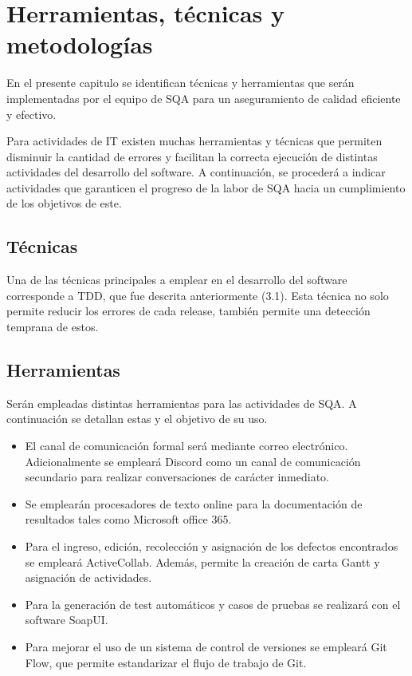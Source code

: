 
\chapter{Herramientas, técnicas y metodologías}

En el presente capitulo se identifican técnicas y herramientas que serán implementadas por el equipo de SQA para un aseguramiento de calidad eficiente y efectivo.

Para actividades de IT existen muchas herramientas y técnicas que permiten disminuir la cantidad de errores y facilitan la correcta ejecución de distintas actividades del desarrollo del software. A continuación, se procederá a indicar actividades que garanticen el progreso de la labor de SQA hacia un cumplimiento de los objetivos de este.

\section{Técnicas}

Una de las técnicas principales a emplear en el desarrollo del software corresponde a TDD, que fue descrita anteriormente (3.1). Esta técnica no solo permite reducir los errores de cada release, también permite una detección temprana de estos.

\section{Herramientas}

Serán empleadas distintas herramientas para las actividades de SQA. A continuación se detallan estas y el objetivo de su uso.

\begin{itemize}
	\item 
		El canal de comunicación formal será mediante correo electrónico. Adicionalmente se empleará Discord como un canal de comunicación secundario para realizar conversaciones de carácter inmediato.
	\item
		Se emplearán procesadores de texto online para la documentación de resultados tales como Microsoft office 365.
	\item
		Para el ingreso, edición, recolección y asignación de los defectos encontrados se empleará ActiveCollab. Además, permite la creación de carta Gantt y asignación de actividades.
	\item
		Para la generación de test automáticos y casos de pruebas se realizará con el software SoapUI.
	\item 
		Para mejorar el uso de un sistema de control de versiones se empleará Git Flow, que permite estandarizar el flujo de trabajo de Git.
\end{itemize}

